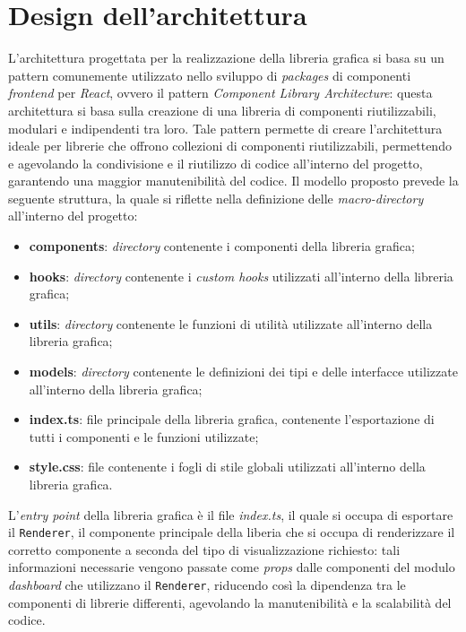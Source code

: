 \section{Design dell'architettura}
L'architettura progettata per la realizzazione della libreria grafica si basa su un pattern comunemente utilizzato nello sviluppo di \textit{packages}
di componenti \textit{frontend} per \textit{React}, ovvero il pattern \textit{Component Library Architecture}: questa architettura si basa sulla creazione di una libreria di
componenti riutilizzabili, modulari e indipendenti tra loro. \newline
Tale pattern permette di creare l'architettura ideale per librerie che offrono collezioni di componenti riutilizzabili, permettendo e agevolando
la condivisione e il riutilizzo di codice all'interno del progetto, garantendo una maggior manutenibilità del codice. \newline
Il modello proposto prevede la seguente struttura, la quale si riflette nella definizione delle \textit{macro-directory} all'interno del progetto:
\begin{itemize}
      \item \textbf{components}: \textit{directory} contenente i componenti della libreria grafica;
      \item \textbf{hooks}: \textit{directory} contenente i \textit{custom hooks} utilizzati all'interno della libreria grafica;
      \item \textbf{utils}: \textit{directory} contenente le funzioni di utilità utilizzate all'interno della libreria grafica;
      \item \textbf{models}: \textit{directory} contenente le definizioni dei tipi e delle interfacce utilizzate all'interno della libreria grafica;
      \item \textbf{index.ts}: file principale della libreria grafica, contenente l'esportazione di tutti i componenti e le funzioni utilizzate;
      \item \textbf{style.css}: file contenente i fogli di stile globali utilizzati all'interno della libreria grafica.
\end{itemize}
L'\textit{entry point} della libreria grafica è il file \textit{index.ts}, il quale si occupa di esportare il \texttt{Renderer}, il componente principale
della liberia che si occupa di renderizzare il corretto componente a seconda del tipo di visualizzazione richiesto: tali informazioni necessarie
vengono passate come \textit{props} dalle componenti del modulo \textit{dashboard} che utilizzano il \texttt{Renderer}, riducendo così la dipendenza tra le
componenti di librerie differenti, agevolando la manutenibilità e la scalabilità del codice.


